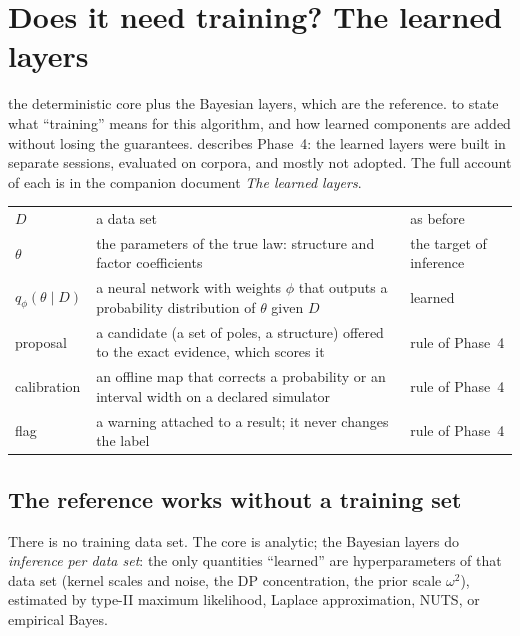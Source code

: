 \section{Does it need training? The learned layers}\label{sec:train}
\sectionbrief
{the deterministic core plus the Bayesian layers, which are the reference.}
{to state what ``training'' means for this algorithm, and how learned components are added without losing the guarantees.}
{describes Phase~4: the learned layers were built in separate sessions, evaluated on corpora, and mostly not adopted. The full account of each is in the companion document \emph{The learned layers}.}

\begin{symbols}
\begin{tabular}{@{}L{2.6cm}L{6.0cm}L{4.3cm}@{}}
$D$ & a data set & as before\\
$\theta$ & the parameters of the true law: structure and factor coefficients & the target of inference\\
$q_\phi(\theta\mid D)$ & a neural network with weights $\phi$ that outputs a probability distribution of $\theta$ given $D$ & learned\\
proposal & a candidate (a set of poles, a structure) offered to the exact evidence, which scores it & rule of Phase~4\\
calibration & an offline map that corrects a probability or an interval width on a declared simulator & rule of Phase~4\\
flag & a warning attached to a result; it never changes the label & rule of Phase~4\\
\end{tabular}
\end{symbols}

\subsection{The reference works without a training set}
There is no training data set. The core is analytic; the Bayesian layers do \emph{inference per data set}: the only quantities ``learned'' are hyperparameters of that data set (kernel scales and noise, the DP concentration, the prior scale $\omega^2$), estimated by type-II maximum likelihood, Laplace approximation, NUTS, or empirical Bayes.

